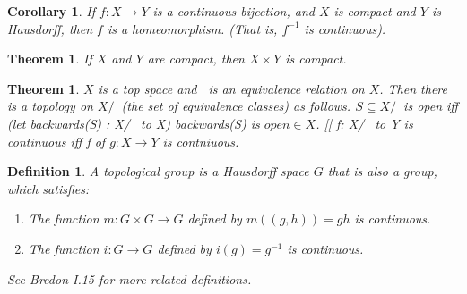 \documentclass[11pt]{amsbook}
\theoremstyle{mystyle} \newtheorem{thrm}[thm]{Theorem}
\theoremstyle{mystyle} \newtheorem{defi}[thm]{Definition}
\theoremstyle{mystyle} \newtheorem{coro}[thm]{Corollary}
\theoremstyle{mystyle} \newtheorem{propo}[thm]{Proposition}
\theoremstyle{mystyle} \newtheorem{lemm}[thm]{Lemma}
\numberwithin{thm}{section}
\newcommand{\de}{\emph}
\begin{document}
\begin{coro}
	If $f : X \to Y$ is a continuous bijection, and $X$ is compact and $Y$ is Hausdorff, then $f$ is a homeomorphism. (That is, $f^{-1}$ is continuous).
\end{coro}
\begin{thrm}
	If $X$ and $Y$ are compact, then $X \times Y$ is compact.
\end{thrm}
\begin{thrm}
	$X$ is a top space and $~$ is an equivalence relation on $X$.  Then there is a topology on $X/~$ (the set of equivalence classes) as follows.  $S \subseteq X/~$ is open iff (let backwards(S) : X/~ to X) backwards(S) is $open \in X$.  [[ f: X/~ to Y is continuous iff f of $g: X \to Y$ is contniuous.
\end{thrm}
\begin{defi}
	A \de{topological group} is a Hausdorff space $G$ that is also a group, which satisfies:
	\begin{enumerate}
		\item The function $m : G \times G \to G$ defined by $m((g,h)) = gh$ is continuous.
		\item The function $i : G \to G$ defined by $i(g) = g^{-1}$ is continuous.
	\end{enumerate}
	See Bredon I.15 for more related definitions.
\end{defi}
\end{document}
